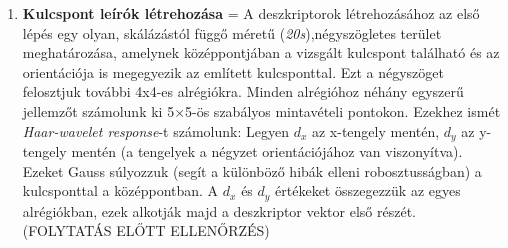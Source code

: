 \documentclass[12pt]{report}
\begin{document}
\begin{enumerate}
\begin{enumerate}
                        \item \textbf{Kulcspont leírók létrehozása} = A deszkriptorok létrehozásához az első lépés egy olyan, skálázástól függő méretű (\textit{20s}),négyszögletes terület meghatározása, amelynek középpontjában a vizsgált kulcspont található és az orientációja is megegyezik az említett kulcsponttal. Ezt a négyszöget felosztjuk további 4x4-es alrégiókra. Minden alrégióhoz néhány egyszerű jellemzőt számolunk ki 5×5-ös szabályos mintavételi pontokon. Ezekhez ismét \textit{Haar-wavelet response}-t számolunk: Legyen \textit{$d_x$} az x-tengely mentén, \textit{$d_y$} az y-tengely mentén (a tengelyek a négyzet orientációjához van viszonyítva). Ezeket Gauss súlyozzuk (segít a különböző hibák elleni robosztusságban) a kulcsponttal a középpontban. A \textit{$d_x$} és \textit{$d_y$} értékeket összegezzük az egyes alrégiókban, ezek alkotják majd a deszkriptor vektor első részét. (FOLYTATÁS ELŐTT ELLENŐRZÉS)
                    \end{enumerate}
                        


\end{enumerate}
\end{document}
